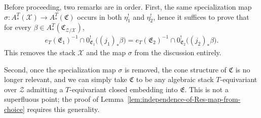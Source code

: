 \begin{remark}\label{rl-000Z}\label{rmk:two-modifications-after-the-residue-independence-lemma-statement}
  Before proceeding, two remarks are in order. First, the same specialization map \(\sigma:A^T_*(\mathcal X)\to A^T_*(\mathfrak C)\) occurs in both \(\eta^!_1\) and \(\eta^!_2\), hence it suffices to prove that for every \(\beta\in A^T_*(\mathfrak C_{\mathcal Z/\mathcal X})\),
  \begin{align}\label{eqn:independence-lemma-simplification}
    e_T(\mathfrak E_1)^{-1}\cap 0^!_{\mathfrak E_1}\big((j_1)_*\beta\big) = e_T(\mathfrak E_2)^{-1}\cap 0^!_{\mathfrak E_2}\big((j_2)_*\beta\big).
  \end{align}
  This removes the stack \(\mathcal X\) and the map \(\sigma\) from the discussion entirely.

  Second, once the specialization map \(\sigma\) is removed, the cone structure of \(\mathfrak C\) is no longer relevant, and we can simply take \(\mathfrak C\) to be any algebraic stack \(T\)-equivariant over \(\mathcal Z\) admitting a \(T\)-equivariant closed embedding into \(\mathfrak E\). This is not a superfluous point; the proof of Lemma~\ref{lem:independence-of-Res-map-from-choice} requires this generality.
\end{remark}
